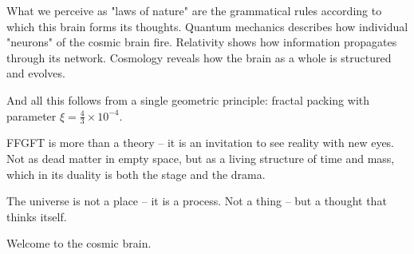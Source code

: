 \documentclass[12pt]{book}
\begin{document}
What we perceive as "laws of nature" are the grammatical rules according to which this brain forms its thoughts. Quantum mechanics describes how individual "neurons" of the cosmic brain fire. Relativity shows how information propagates through its network. Cosmology reveals how the brain as a whole is structured and evolves.

And all this follows from a single geometric principle: fractal packing with parameter $\xi = \frac{4}{3} \times 10^{-4}$.

FFGFT is more than a theory – it is an invitation to see reality with new eyes. Not as dead matter in empty space, but as a living structure of time and mass, which in its duality is both the stage and the drama.

The universe is not a place – it is a process. Not a thing – but a thought that thinks itself.

Welcome to the cosmic brain.
\end{document}
